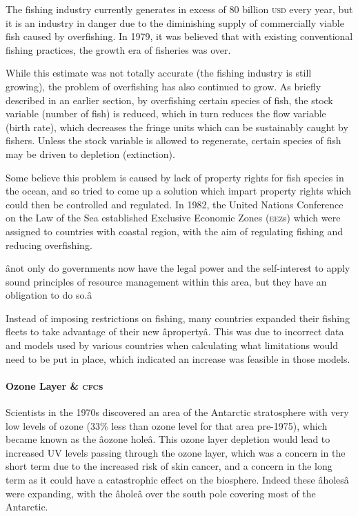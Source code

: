 The fishing industry currently generates in excess of 80 billion \textsc{usd} every year, but it is an industry in danger due to the diminishing supply of commercially viable fish caused by overfishing. In 1979, it was believed that with existing conventional fishing practices, the growth era of fisheries was over.

While this estimate was not totally accurate (the fishing industry is still growing), the problem of overfishing has also continued to grow. As briefly described in an earlier section, by overfishing certain species of fish, the stock variable (number of fish) is reduced, which in turn reduces the flow variable (birth rate), which decreases the fringe units which can be sustainably caught by fishers. Unless the stock variable is allowed to regenerate, certain species of fish may be driven to depletion (extinction).

Some believe this problem is caused by lack of property rights for fish species in the ocean, and so tried to come up a solution which impart property rights which could then be controlled and regulated. In 1982, the United Nations Conference on the Law of the Sea established Exclusive Economic Zones (\textsc{eez}s) which were assigned to countries with coastal region, with the aim of regulating fishing and reducing overfishing.~\cite{Canada-sea-law}

ânot only do governments now have the legal power and the self-interest to apply sound principles of resource management within this area, but they have an obligation to do so.â

Instead of imposing restrictions on fishing, many countries expanded their fishing fleets to take advantage of their new âpropertyâ. This was due to incorrect data and models used by various countries when calculating what limitations would need to be put in place, which indicated an increase was feasible in those models.

\paragraph{Ozone Layer \& \textsc{cfc}s}

Scientists in the 1970s discovered an area of the Antarctic stratosphere with very low levels of ozone (33\% less than ozone level for that area pre-1975), which became known as the âozone holeâ. This ozone layer depletion would lead to increased UV levels passing through the ozone layer, which was a concern in the short term due to the increased risk of skin cancer, and a concern in the long term as it could have a catastrophic effect on the biosphere. Indeed these âholesâ were expanding, with the âholeâ over the south pole covering most of the Antarctic.


